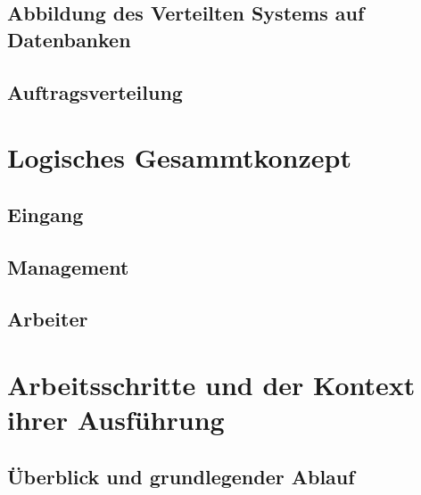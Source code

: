 \subsection{Abbildung des Verteilten Systems auf Datenbanken}




\subsection{Auftragsverteilung}

\section{Logisches Gesammtkonzept}
\subsection{Eingang}
\subsection{Management}
\subsection{Arbeiter}

\section{Arbeitsschritte und der Kontext ihrer Ausführung}

\subsection{Überblick und grundlegender Ablauf}

